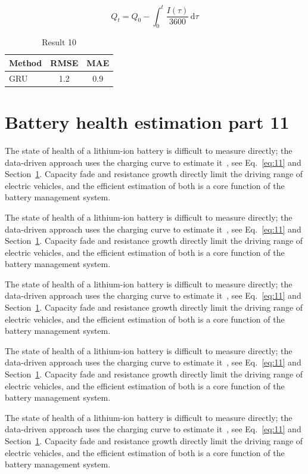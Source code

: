 \documentclass[11pt]{article}
\begin{document}
\begin{equation}\label{eq:10}
  Q_t = Q_0 - \int_0^t \frac{I(\tau)}{3600}\,\mathrm{d}\tau
\end{equation}
\begin{table}[h]\centering\begin{tabular}{lcc}\toprule Method & RMSE & MAE\\\midrule GRU & 1.2 & 0.9\\\bottomrule\end{tabular}\caption{Result 10}\end{table}

\section{Battery health estimation part 11}\label{sec:11}
The state of health of a lithium-ion battery is difficult to measure directly; the data-driven approach uses the charging curve to estimate it~\cite{a2020}, see Eq.~\eqref{eq:11} and Section~\ref{sec:11}. Capacity fade and resistance growth directly limit the driving range of electric vehicles, and the efficient estimation of both is a core function of the battery management system.

The state of health of a lithium-ion battery is difficult to measure directly; the data-driven approach uses the charging curve to estimate it~\cite{a2020}, see Eq.~\eqref{eq:11} and Section~\ref{sec:11}. Capacity fade and resistance growth directly limit the driving range of electric vehicles, and the efficient estimation of both is a core function of the battery management system.

The state of health of a lithium-ion battery is difficult to measure directly; the data-driven approach uses the charging curve to estimate it~\cite{a2020}, see Eq.~\eqref{eq:11} and Section~\ref{sec:11}. Capacity fade and resistance growth directly limit the driving range of electric vehicles, and the efficient estimation of both is a core function of the battery management system.

The state of health of a lithium-ion battery is difficult to measure directly; the data-driven approach uses the charging curve to estimate it~\cite{a2020}, see Eq.~\eqref{eq:11} and Section~\ref{sec:11}. Capacity fade and resistance growth directly limit the driving range of electric vehicles, and the efficient estimation of both is a core function of the battery management system.

The state of health of a lithium-ion battery is difficult to measure directly; the data-driven approach uses the charging curve to estimate it~\cite{a2020}, see Eq.~\eqref{eq:11} and Section~\ref{sec:11}. Capacity fade and resistance growth directly limit the driving range of electric vehicles, and the efficient estimation of both is a core function of the battery management system.
\end{document}
